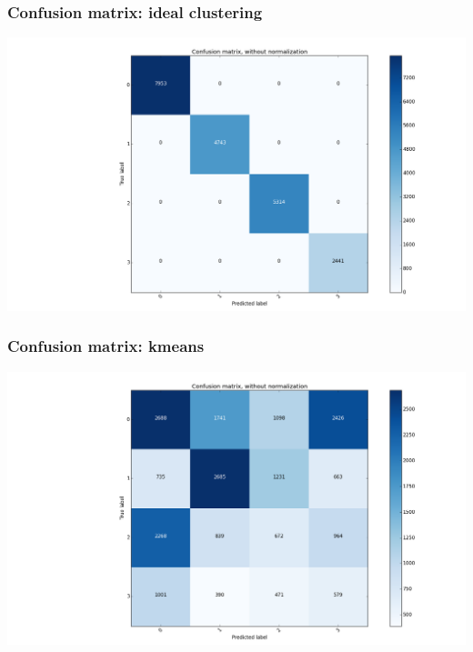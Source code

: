 \documentclass{beamer}
\begin{document}
\begin{frame}
\frametitle{Confusion matrix: ideal clustering}
    \includegraphics[width=1\linewidth]{../REPORT/Figures_Mik/label_distribution.png} 
\begin{figure} 
\end{figure}
\end{frame}

\begin{frame}
\frametitle{Confusion matrix: kmeans}
    \includegraphics[width=1\linewidth]{../REPORT/Figures_Mik/kmeans2.png} 
\begin{figure} 
\end{figure}
\end{frame}
\end{document}
